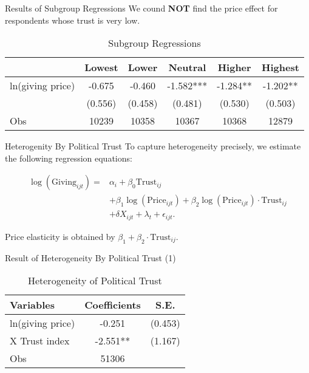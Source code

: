 \documentclass[
  ignorenonframetext,
]{beamer}
\begin{document}
\begin{frame}{Results of Subgroup Regressions}
\protect\hypertarget{results-of-subgroup-regressions}{}
We cound \textbf{NOT} find the price effect for respondents whose trust
is very low.

\begin{table}

\caption{\label{tab:kableTabTrustGroupReg}Subgroup Regressions}
\centering
\fontsize{9}{11}\selectfont
\begin{tabular}[t]{lccccc}
\toprule
 & Lowest & Lower & Neutral & Higher & Highest\\
\midrule
ln(giving price) & -0.675 & -0.460 & -1.582*** & -1.284** & -1.202**\\
 & (0.556) & (0.458) & (0.481) & (0.530) & (0.503)\\
Obs & 10239 & 10358 & 10367 & 10368 & 12879\\
\bottomrule
\end{tabular}
\end{table}
\end{frame}

\begin{frame}{Heterogenity By Political Trust}
\protect\hypertarget{heterogenity-by-political-trust}{}
To capture heterogeneity precisely, we estimate the following regression
equations:

\begin{align*}
    \log(\text{Giving}_{ijt}) = 
    &\alpha_i + \beta_0 \text{Trust}_{ij} \\
    &+ \beta_1 \log(\text{Price}_{ijt}) + \beta_2 \log(\text{Price}_{ijt})\cdot\text{Trust}_{ij} \\
    &+ \delta X_{ijt} + \lambda_t + \epsilon_{ijt}.
\end{align*}

Price elasticity is obtained by
\(\beta_1 + \beta_2\cdot\text{Trust}_{ij}\).
\end{frame}

\begin{frame}{Result of Heterogeneity By Political Trust (1)}
\protect\hypertarget{result-of-heterogeneity-by-political-trust-1}{}
\begin{table}

\caption{\label{tab:kableTabTrustHeteroReg}Heterogeneity of Political Trust}
\centering
\begin{tabular}[t]{lcc}
\toprule
Variables & Coefficients & S.E.\\
\midrule
ln(giving price) & -0.251 & (0.453)\\
\hspace{1em}X Trust index & -2.551** & (1.167)\\
Obs & 51306 & \\
\bottomrule
\end{tabular}
\end{table}
\end{frame}
\end{document}
